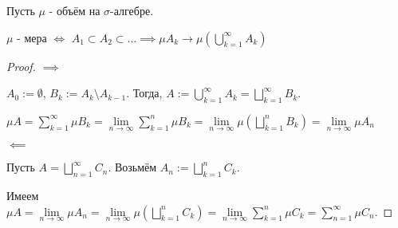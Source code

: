 \begin{theorem} \thmslashn

    Пусть $\mu$ - объём на $\sigma$-алгебре.

    $\mu$ - мера $\iff$ $A_1 \subset A_2 \subset \ldots \implies \mu A_{k} \to \mu\left( \bigcup\limits_{k=1}^{\infty}  A_{k}\right)$
    \begin{proof} \thmslashn
    
        $\implies$


        $A_0 := \emptyset$, $B_{k} := A_{k} \setminus A_{k-1}$. Тогда, $A := \bigcup\limits_{k=1}^{\infty} A_{k} = \bigsqcup\limits_{k=1}^{\infty} B_{k}$.

        $\mu A = \sum\limits_{k=1}^{\infty} \mu B_{k} = \lim\limits_{n \to \infty} \sum\limits_{k=1}^{n} \mu B_{k} = \lim\limits_{n \to \infty}  \mu \left( \bigsqcup\limits_{k=1}^{n} B_{k} \right) = \lim\limits_{n \to \infty} \mu A_{n}$ 

        $\impliedby$

        Пусть $A = \bigsqcup\limits_{n=1}^{\infty} C_{n}$. Возьмём $A_{n} := \bigsqcup\limits_{k=1}^{n} C_{k}$.

        Имеем $\mu A = \lim\limits_{n \to \infty} \mu A_{n} = \lim\limits_{n \to \infty} \mu \left( \bigsqcup\limits_{k=1}^{n} C_{k} \right) = \lim\limits_{n \to \infty} \sum\limits_{k=1}^{n} \mu C_{k} = \sum\limits_{n=1}^{\infty} \mu C_{n}$.
    \end{proof}
\end{theorem}
